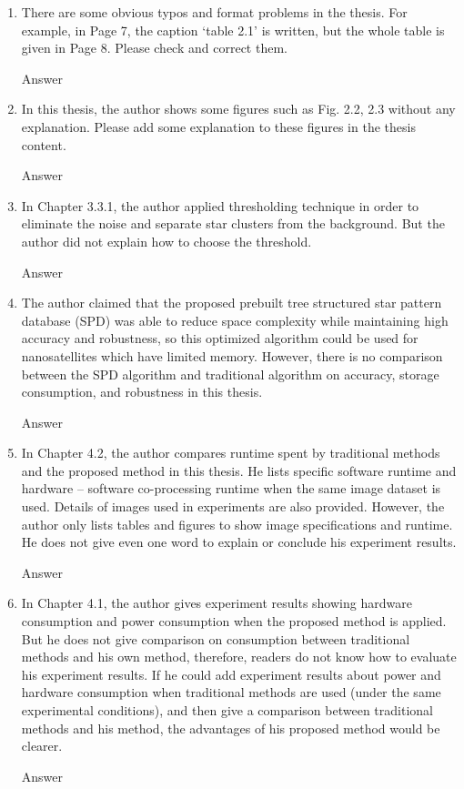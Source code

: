 \documentclass[dvips,a4paper,12pt]{report}
\begin{document}
\begin{enumerate}
    \color{blue}
    \item There are some obvious typos and format problems in the thesis. For example, in Page 7, the caption ‘table 2.1’ is written, but the whole table is given in Page 8. Please check and correct them.

    \color{black}
    Answer

    \color{blue}
    \item In this thesis, the author shows some figures such as Fig. 2.2, 2.3 without any explanation. Please add some explanation to these figures in the thesis content.

    \color{black}
    Answer

    \color{blue}
    \item In Chapter 3.3.1, the author applied thresholding technique in order to eliminate the noise and separate star clusters from the background. But the author did not explain how to choose the threshold.

    \color{black}
    Answer

    \color{blue}
    \item The author claimed that the proposed prebuilt tree structured star pattern database (SPD) was able to reduce space complexity while maintaining high accuracy and robustness, so this optimized algorithm could be used for nanosatellites which have limited memory. However, there is no comparison between the SPD algorithm and traditional algorithm on accuracy, storage consumption, and robustness in this thesis.

    \color{black}
    Answer

    \color{blue}
    \item In Chapter 4.2, the author compares runtime spent by traditional methods and the proposed method in this thesis. He lists specific software runtime and hardware – software co-processing runtime when the same image dataset is used. Details of images used in experiments are also provided. However, the author only lists tables and figures to show image specifications and runtime. He does not give even one word to explain or conclude his experiment results.

    \color{black}
    Answer

    \color{blue}
    \item In Chapter 4.1, the author gives experiment results showing hardware consumption and power consumption when the proposed method is applied. But he does not give comparison on consumption between traditional methods and his own method, therefore, readers do not know how to evaluate his experiment results. If he could add experiment results about power and hardware consumption when traditional methods are used (under the same experimental conditions), and then give a comparison between traditional methods and his method, the advantages of his proposed method would be clearer.

    \color{black}
    Answer

\end{enumerate}

\end{document}
